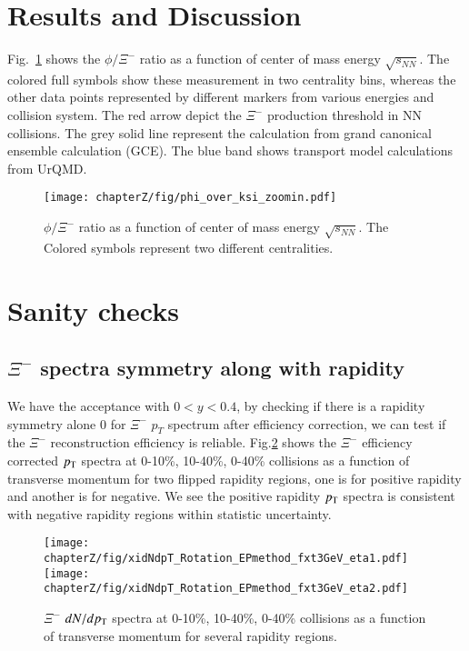 \section{Results and Discussion}
Fig.~\ref{fig:final_ratio} shows the $\phi/\Xi^-$ ratio as a function of center of mass energy $\sqrt{s_{NN}}$. The colored full symbols show these measurement in two centrality bins, whereas the other data points represented by different markers from various energies and collision system. The red arrow depict the $\Xi^-$ production threshold in NN collisions. The grey solid line represent the calculation from grand canonical ensemble calculation (GCE). The blue band shows transport model calculations from UrQMD.

\begin{figure*}[hbt!]
\texttt{[image: chapterZ/fig/phi\_over\_ksi\_zoomin.pdf]}
\caption{$\phi/\Xi^-$ ratio as a function of center of mass energy $\sqrt{s_{NN}}$. The Colored symbols represent two different centralities.}
\label{fig:final_ratio}
\end{figure*}


\section{Sanity checks}
\subsection{$\Xi^{-}$ spectra symmetry along with rapidity}
We have the acceptance with $0<y<0.4$, by checking if there is a rapidity symmetry alone 0 for $\Xi^{-}$ $p_{T}$ spectrum after efficiency correction, we can test if the $\Xi^{-}$ reconstruction efficiency is reliable. 
Fig.\ref{fig:rap_check}  shows the $\Xi^{-}$ efficiency corrected $p_{\rm T}$ spectra at 0-10\%, 10-40\%, 0-40\% collisions as a function of transverse momentum for two flipped rapidity regions, one is for positive rapidity and another is for negative. We see the positive rapidity $p_{\rm T}$ spectra is consistent with negative rapidity regions within statistic uncertainty.
\begin{figure*}[hbt!]
\texttt{[image: chapterZ/fig/xidNdpT\_Rotation\_EPmethod\_fxt3GeV\_eta1.pdf]}
\texttt{[image: chapterZ/fig/xidNdpT\_Rotation\_EPmethod\_fxt3GeV\_eta2.pdf]}
\caption{$\Xi^{-}$ $dN/dp_{\rm T}$ spectra at 0-10\%, 10-40\%, 0-40\% collisions as a function of transverse momentum for several rapidity regions.}
\label{fig:rap_check}
\end{figure*}

